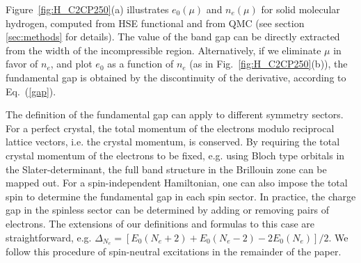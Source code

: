 Figure~\ref{fig:H_C2CP250}(a) illustrates $e_0(\mu)$ and $n_e(\mu)$ for solid molecular hydrogen, computed from HSE functional and from QMC (see section \ref{sec:methods} for details). The value of the  band
gap can be directly extracted from the width of the incompressible region.
Alternatively, if we
eliminate $\mu$ in favor of $n_e$, and plot $e_0$ as a function of $n_e$ (as in Fig.~\ref{fig:H_C2CP250}(b)),
the fundamental gap is obtained by the discontinuity of the derivative, according to 
Eq.~(\ref{gap}).

The definition of the fundamental gap can apply to different symmetry sectors.
For a perfect crystal, the total momentum of the electrons modulo 
reciprocal lattice vectors, i.e. the crystal momentum, is conserved. By requiring the total crystal momentum of the electrons to be fixed,
e.g. using Bloch type orbitals in the Slater-determinant,
the full band structure in the Brillouin zone can be mapped out.
For a spin-independent Hamiltonian, one can also impose the total spin 
to determine the fundamental gap in each spin sector. %
In practice, the charge gap in the spinless sector can
be determined by  adding or removing pairs of electrons. The extensions of our definitions and formulas to this case are straightforward,
e.g. $\Delta_{N_e}=[E_0(N_e+2)+E_0(N_e-2)-2E_0(N_e)]/2$. We follow this procedure of spin-neutral excitations in the remainder of the paper.


